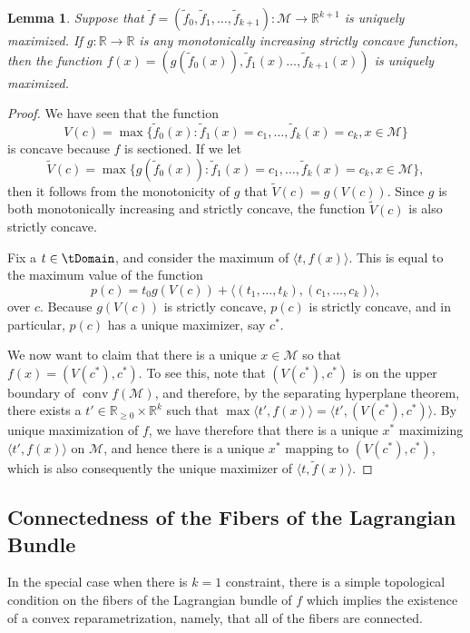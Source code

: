 \documentclass{article}
\numberwithin{equation}{section}
\newcommand{\R}{\mathbb{R}}
\DeclareMathOperator*{\conv}{conv}
\newtheorem{lemma}{Lemma}[section]
\newcommand{\cM}{{\mathcal{M}}}
\begin{document}
\begin{lemma}
\label{lem:concave_composition}
    Suppose that $\tilde f = (\tilde f_0, \tilde f_1, \dots, \tilde f_{k+1}) : \cM \rightarrow \R^{k+1}$ is uniquely maximized. If $g : \R \rightarrow \R$ is any monotonically increasing strictly concave function, then the function $f(x) = (g(\tilde f_0(x)),\tilde f_1(x) \dots, \tilde f_{k+1}(x))$ is uniquely maximized.
\end{lemma}
\begin{proof}
We have seen that the function
\[
    V(c) = \max \{\tilde f_0(x)  : \tilde f_1(x) = c_1, \dots, \tilde f_k(x) = c_k, x \in \cM\}
\]
is concave because $f$ is sectioned.
If we let
\[
    \widetilde{V}(c) = \max \{g(\tilde f_0(x))  : \tilde f_1(x) = c_1, \dots, \tilde f_k(x) = c_k, x \in \cM\},
\]
then it follows from the monotonicity of $g$ that $\widetilde{V}(c) = g(V(c))$. Since $g$ is both monotonically increasing and strictly concave, the function  $\widetilde{V}(c)$ is also strictly concave.

Fix a $t \in \tDomain$, and consider the maximum of $\langle t, f(x)\rangle$. This is equal to the maximum value of the function
\[
    p(c) = t_0g(V(c)) + \langle (t_1,\dots,t_k), (c_1,\dots,c_k)\rangle,
\]
over $c$.
Because $g(V(c))$ is strictly concave, $p(c)$ is strictly concave, and in particular, $p(c)$ has a unique maximizer, say $c^*$. 

We now want to claim that there is a unique $x \in \cM$ so that $f(x) = (V(c^*), c^*)$. To see this, note that $(V(c^*), c^*)$ is on the upper boundary of $\conv f(\cM)$, and therefore, by the separating hyperplane theorem, there exists a $t' \in \R_{\ge 0} \times \R^k$ such that $\max \langle t', f(x)\rangle = \langle t', (V(c^*), c^*)\rangle$. By unique maximization of $f$, we have therefore that there is a unique $x^*$ maximizing $\langle t', f(x)\rangle$ on $\cM$, and hence there is a unique $x^*$ mapping to $(V(c^*), c^*)$, which is also consequently the unique maximizer of $\langle t, \tilde{f}(x)\rangle$.
\end{proof}

\subsection{Connectedness of the Fibers of the Lagrangian Bundle}
\label{subsec:connected_fibers}
In the special case when there is $k=1$ constraint, there is a simple topological condition on the fibers of the Lagrangian bundle of $f$ which implies the existence of a convex reparametrization, namely, that all of the fibers are connected.
\end{document}
